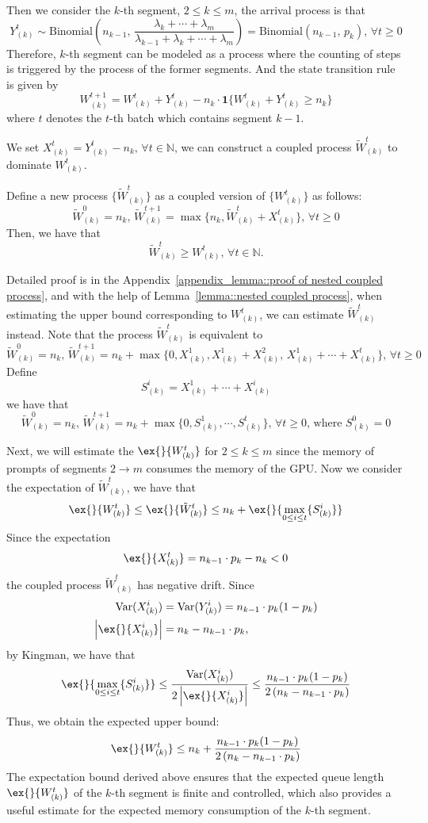 Then we consider the $k$-th segment, $2\leq k\leq m$, the arrival process is that 
$$Y^t_{(k)} \sim \text{Binomial}\left(  n_{k-1} ,\, \frac{\lambda_{k}+\cdots+\lambda_m }{\lambda_{k-1}+\lambda_k+\cdots+\lambda_m} \right) = \text{Binomial}( n_{k-1} ,\, p_k),\,\forall t \ge 0$$
Therefore, $k$-th segment can be modeled as a process where the counting of steps is triggered by the process of the former segments. And the state transition rule is given by
$$W^{t+1}_{(k)}=W^{t}_{(k)}+Y^t_{(k)} - n_{k}\cdot \mathbf{1}\{ W^{t}_{(k)}+Y^t_{(k)}\geq n_{k}  \}$$
where $t$ denotes the $t$-th batch which contains segment $k-1$.

We set $X^t_{(k)} = Y^t_{(k)} - n_{k},\,\forall t\in \mathbb{N} $, we can construct a coupled process $\tilde{W}^t_{(k)}$ to dominate $W^t_{(k)}$.
\begin{lemma}\label{lemma::nested coupled process}
Define a new process $\{ \tilde{W}^t_{(k)} \}$ as a coupled version of $\{ W^t_{(k)} \}$ as follows:
$$\tilde{W}^0_{(k)} = n_{k},\,\tilde{W}^{t+1}_{(k)}=
\max\{ n_{k},\tilde{W}^{t}_{(k)} + X^t_{(k)}\},\,\forall t\geq 0$$
Then, we have that 
$$ \tilde{W}_{(k)}^t \geq W^t_{(k)},\,\forall t\in \mathbb{N} .$$
\end{lemma}
Detailed proof is in the Appendix~\ref{appendix_lemma::proof of nested coupled process}, and with the help of Lemma~\ref{lemma::nested coupled process}, when estimating the upper bound corresponding to $W^t_{(k)}$, we can estimate $\tilde{W}^t_{(k)}$ instead. Note that the process $\tilde{W}^t_{(k)}$ is equivalent to
$$\tilde{W}^0_{(k)} = n_{k},\,\tilde{W}^{t+1}_{(k)} =n_{k}+ \max\{ 0, X^1_{(k)},X^1_{(k)}+X^2_{(k)},\, X^1_{(k)}+\cdots+X^t_{(k)} \},\,\forall t\geq 0$$
Define 
$$S^i_{(k)} = X^1_{(k)}+\cdots+X^i_{(k)}$$
we have that
$$\tilde{W}^0_{(k)} = n_{k},\,\tilde{W}^{t+1}_{(k)} =n_{k}+ \max\{ 0, S^1_{(k)} ,\cdots,S^t_{(k)}  \},\,\forall t\geq 0,\,\text{where }S^0_{(k)}=0$$

Next, we will estimate the $\ex{}{W^{t}_{(k)}}$ for $2\leq k\leq m$ since the memory of prompts of segments $2\to m$ consumes the memory of the GPU. Now we consider the expectation of $\tilde{W}^t_{(k)}$, we have that 
$$\ex{}{W^t_{(k)}}\leq \ex{}{\tilde{W}^t_{(k)}}\leq n_k+\ex{}{\max_{0\leq i\leq t}\{S^i_{(k)}\}} $$
Since the expectation
$$\ex{}{X^t_{(k)}} =  n_{k-1}\cdot p_k - n_{k}<0 $$
the coupled process $\tilde{W}^t_{(k)}$ has negative drift. Since
\begin{align*}
    \text{Var}(X^i_{(k)})&=\text{Var}(Y^i_{(k)})=n_{k-1}\cdot p_k(1-p_k)\\
    \left|\ex{}{X^i_{(k)}}\right|&= n_{k}-n_{k-1}\cdot p_k,
\end{align*}
by Kingman, we have that
$$\ex{}{\max_{0\leq i\leq t}\{S^i_{(k)}\}}  \leq  \frac{\text{Var}(X^i_{(k)})}{ 2\left|\ex{}{X^i_{(k)}}\right| }\leq   \frac{n_{k-1}\cdot p_k(1-p_k)}{2\left(n_{k}-n_{k-1}\cdot p_k\right)}$$
Thus, we obtain the expected upper bound:
$$\ex{}{W^t_{(k)}}\leq n_k +\frac{n_{k-1}\cdot p_k(1-p_k)}{2\left(n_{k}-n_{k-1}\cdot p_k\right)}$$
The expectation bound derived above ensures that the expected queue length $\ex{}{W^t_{(k)}}$ of the $k$-th segment is finite and controlled, which also provides a useful estimate for the expected memory consumption of the $k$-th segment. 

